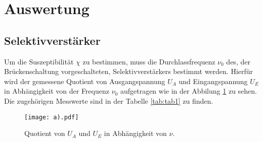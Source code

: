 \section{Auswertung}
\label{sec:Auswertung}
\subsection{Selektivverstärker}
Um die Suszeptibilität $\chi$ zu bestimmen, muss die
Durchlassfrequenz $\nu_0$ des, der Brückenschaltung
vorgeschalteten, Selektivverstärkers
bestimmt werden.  Hierfür wird der gemessene Quotient von Ausgangspannung $U_A$
und Eingangspannung $U_E$ in Abhängigkeit von der Frequenz $\nu_0$
aufgetragen wie in der Abbilung \ref{fig:plot1} zu sehen.
Die zugehörigen Messwerte sind in der Tabelle \ref{tab:tab1} zu finden.
\begin{figure}
  \centering
  \texttt{[image: a).pdf]}
  \caption{Quotient von $U_A$ und $U_E$ in Abhängigkeit von $\nu$. }
  \label{fig:plot1}
\end{figure}


